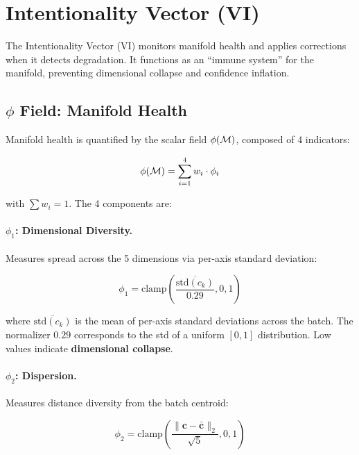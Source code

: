 
\section{Intentionality Vector (VI)}
\label{sec:vi}

The Intentionality Vector (VI) monitors manifold health and applies
corrections when it detects degradation. It functions as an ``immune
system'' for the manifold, preventing dimensional collapse and
confidence inflation.

\subsection{$\phi$ Field: Manifold Health}

Manifold health is quantified by the scalar field $\phi(\mathcal{M})$,
composed of 4 indicators:

\begin{equation}
    \phi(\mathcal{M}) = \sum_{i=1}^{4} w_i \cdot \phi_i
    \label{eq:phi_field}
\end{equation}

with $\sum w_i = 1$. The 4 components are:

\paragraph{$\phi_1$: Dimensional Diversity.}
Measures spread across the 5 dimensions via per-axis standard deviation:

\begin{equation}
    \phi_1 = \text{clamp}\left(\frac{\overline{\text{std}(c_k)}}{0.29}, 0, 1\right)
\end{equation}

where $\overline{\text{std}(c_k)}$ is the mean of per-axis standard
deviations across the batch. The normalizer $0.29$ corresponds to the
std of a uniform $[0,1]$ distribution. Low values indicate
\textbf{dimensional collapse}.

\paragraph{$\phi_2$: Dispersion.}
Measures distance diversity from the batch centroid:

\begin{equation}
    \phi_2 = \text{clamp}\left(\frac{\|\bm{c} - \bar{\bm{c}}\|_2}{\sqrt{5}}, 0, 1\right)
\end{equation}

